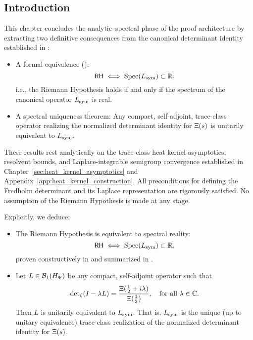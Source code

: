 \subsection*{Introduction}
\label{sec:intro_spectral_implications}

This chapter concludes the analytic–spectral phase of the proof architecture by extracting two definitive consequences from the canonical determinant identity established in :

\begin{itemize}
  \item A formal equivalence ():
  \[
  \mathsf{RH} \iff \operatorname{Spec}(L_{\mathrm{sym}}) \subset \mathbb{R},
  \]
  i.e., the Riemann Hypothesis holds if and only if the spectrum of the canonical operator \( L_{\mathrm{sym}} \) is real.

  \item A spectral uniqueness theorem: Any compact, self-adjoint, trace-class operator realizing the normalized determinant identity for \( \Xi(s) \) is unitarily equivalent to \( L_{\mathrm{sym}} \).
\end{itemize}

These results rest analytically on the trace-class heat kernel asymptotics, resolvent bounds, and Laplace-integrable semigroup convergence established in Chapter~\ref{sec:heat_kernel_asymptotics} and Appendix~\ref{app:heat_kernel_construction}. All preconditions for defining the Fredholm determinant and its Laplace representation are rigorously satisfied. No assumption of the Riemann Hypothesis is made at any stage.

\medskip

Explicitly, we deduce:

\begin{itemize}
  \item The Riemann Hypothesis is equivalent to spectral reality:
  \[
  \mathsf{RH} \iff \operatorname{Spec}(L_{\mathrm{sym}}) \subset \mathbb{R},
  \]
  proven constructively in  and summarized in .

  \item Let \( L \in \mathcal{B}_1(H_{\Psi}) \) be any compact, self-adjoint operator such that
  \[
  \det\nolimits_\zeta(I - \lambda L) = \frac{\Xi(\tfrac{1}{2} + i\lambda)}{\Xi(\tfrac{1}{2})}, \quad \text{for all } \lambda \in \mathbb{C}.
  \]
  Then \( L \) is unitarily equivalent to \( L_{\mathrm{sym}} \). That is, \( L_{\mathrm{sym}} \) is the unique (up to unitary equivalence) trace-class realization of the normalized determinant identity for \( \Xi(s) \).
\end{itemize}


